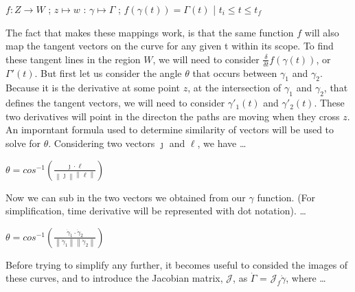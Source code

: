 \documentclass[a4paper,man,natbib]{apa6}
\begin{document}
\begin{center}

      $ f : Z \to W $ ; $ z \mapsto w $ : $ \gamma \mapsto \Gamma $ ; $ f(\gamma(t)) = \Gamma(t) $ | $ t_{i} \leq t \leq t_{f} $

\end{center}

The fact that makes these mappings work, is that the same function $ f $ will also map the tangent vectors on the curve for any given t within its scope.
To find these tangent lines in the region $ W $, we will need to consider $ \frac{\delta}{\delta t}f(\gamma(t)) $, or $ \Gamma'(t) $.
But first let us consider the angle $ \theta $ that occurs between $ \gamma_1 $ and $ \gamma_2 $. 
Because it is the derivative at some point $ z $, at the intersection of $ \gamma_1 $ and $ \gamma_2 $, that 
defines the tangent vectors, we will need to consider $ \gamma'_1(t) $ and $ \gamma'_2(t) $. These two derivatives will 
point in the directon the paths are moving when they cross $ z $. 
An imporntant formula used to determine similarity of vectors will be used to solve for $ \theta $.
Considering two vectors $ \jmath $ and $ \ell $, we have \dots

\begin{center}

      $ \theta = cos^{-1}(\frac{\jmath  \cdot \ell }{\left\lVert \jmath \right\rVert \left\lVert \ell  \right\rVert })$

\end{center}

Now we can sub in the two vectors we obtained from our $ \gamma $ function. (For simplification, time derivative will be represented with dot notation). \dots

\begin{center}

      $ \theta = cos^{-1}(\frac{\dot{\gamma}_1  \cdot \dot{\gamma}_2 }{\left\lVert \dot{\gamma}_1 \right\rVert \left\lVert \dot{\gamma}_2  \right\rVert })$

\end{center}

Before trying to simplify any further, it becomes useful to consided the images of these curves, and to introduce the Jacobian matrix, $ \mathcal{J} $, as $ \dot{\Gamma} $ = $ \mathcal{J}_f\dot{\gamma}$, where \dots
\end{document}
